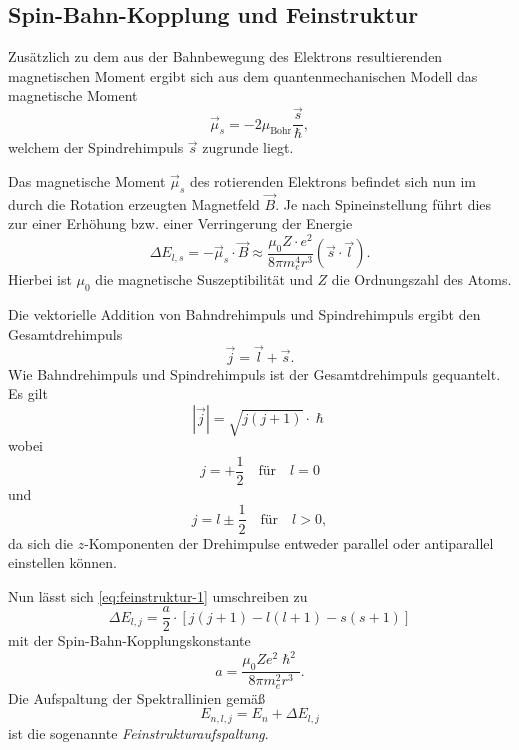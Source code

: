 \documentclass[../bericht.tex]{subfiles}
\begin{document}
      \subsection{Spin-Bahn-Kopplung und Feinstruktur}
      \label{subsec:feinstruktur}

        Zusätzlich zu dem aus der Bahnbewegung des Elektrons resultierenden magnetischen Moment ergibt sich aus dem quantenmechanischen Modell das magnetische Moment
        \begin{equation*}
          \vec{\mu}_s=-2\mu_\mathrm{Bohr}\frac{\vec{s}}{\hslash},
        \end{equation*}
        welchem der Spindrehimpuls $\vec{s}$ zugrunde liegt.

        Das magnetische Moment $\vec{\mu}_s$ des rotierenden Elektrons befindet sich nun im durch die Rotation erzeugten Magnetfeld $\vec{B}$. Je nach Spineinstellung führt dies zur einer Erhöhung bzw. einer Verringerung der Energie
        \begin{equation}
          \Delta E_{l,s}=-\vec{\mu}_s\cdot \vec{B}\approx \frac{\mu_0Z\cdot e^2}{8\pi m_e^4r^3}\left( \vec{s}\cdot \vec{l}\right).
          \label{eq:feinstruktur-1}
        \end{equation}
        Hierbei ist $\mu_0$ die magnetische Suszeptibilität und $Z$ die Ordnungszahl des Atoms.

        Die vektorielle Addition von Bahndrehimpuls und Spindrehimpuls ergibt den Gesamtdrehimpuls
        \begin{equation*}
          \vec{j}=\vec{l}+\vec{s}.
        \end{equation*}
        Wie Bahndrehimpuls und Spindrehimpuls ist der Gesamtdrehimpuls gequantelt. Es gilt
        \begin{equation*}
          |\vec{j}|=\sqrt{j(j+1)}\cdot \hslash
        \end{equation*}
        wobei
        \begin{equation*}
          j=+\frac{1}{2} \quad \text{für} \quad l=0
        \end{equation*}
        und
        \begin{equation*}
          j=l\pm \frac{1}{2} \quad \text{für} \quad l>0,
        \end{equation*}
        da sich die $z$-Komponenten der Drehimpulse entweder parallel oder antiparallel einstellen können.

        Nun lässt sich \eqref{eq:feinstruktur-1} umschreiben zu
        \begin{equation}
          \Delta E_{l,j}=\frac{a}{2}\cdot \left[j(j+1)-l(l+1)-s(s+1)\right]
        \end{equation}
        mit der Spin-Bahn-Kopplungskonstante
        \begin{equation*}
          a=\frac{\mu_0 Z e^2\hslash ^2}{8\pi m_e^2r^3}.
        \end{equation*}
        Die Aufspaltung der Spektrallinien gemä\ss
        \begin{equation}
          E_{n,l,j}=E_n + \Delta E_{l,j}
        \end{equation}
        ist die sogenannte \textit{Feinstrukturaufspaltung}.
\end{document}

